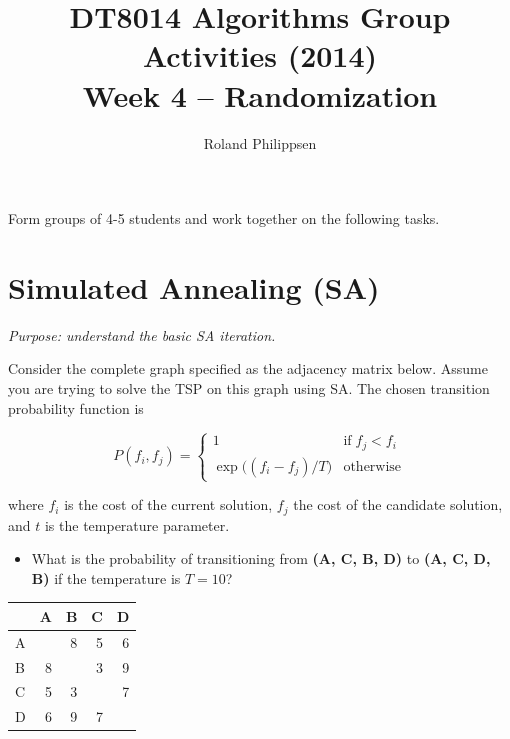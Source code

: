 \documentclass[a4paper]{article}
\begin{document}
\title{
  \large
  DT8014 Algorithms Group Activities (2014)\\
  \Large
  Week 4 -- Randomization}
\author{Roland Philippsen}
\maketitle



\noindent
Form groups of 4-5 students and work together on the following tasks.


%



\section*{Simulated Annealing (SA)}

\emph{Purpose: understand the basic SA iteration.}

\noindent
Consider the complete graph specified as the adjacency matrix below.
Assume you are trying to solve the TSP on this graph using SA.
The chosen transition probability function is

\begin{equation}
  P (f_i, f_j) = \begin{cases}
    1                     &\text{if}\; f_j < f_i \\
    \exp{\bigl((f_i - f_j) / T\bigr)} &\text{otherwise}
  \end{cases}
\end{equation}

\noindent
where $f_i$ is the cost of the current solution, $f_j$ the cost of the candidate solution, and $t$ is the temperature parameter.

\begin{itemize}
\item
  What is the probability of transitioning from \textbf{(A, C, B, D)} to \textbf{(A, C, D, B)} if the temperature is $T=10$?
\end{itemize}

\begin{center}
  \begin{tabular}{lrrrr}
    \toprule
      &  A &  B &  C &  D \\
    \midrule
    A &    &  8 &  5 &  6 \\
    B &  8 &    &  3 &  9 \\
    C &  5 &  3 &    &  7 \\
    D &  6 &  9 &  7 &    \\
    \bottomrule
  \end{tabular}
\end{center}
\end{document}
